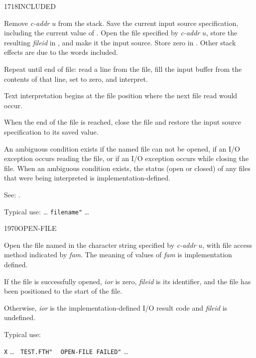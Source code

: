 \begin{newword}{1718}{INCLUDED}

	Remove \emph{c-addr} $u$ from the stack. Save the current input
	source specification, including the current value of
	. Open the file specified by \emph{c-addr} $u$,
	store the resulting \emph{fileid} in , and make
	it the input source. Store zero in . Other
	stack effects are due to the words included.

	Repeat until end of file: read a line from the file, fill the
	input buffer from the contents of that line, set 
	to zero, and interpret.

	Text interpretation begins at the file position where the next
	file read would occur.

	When the end of the file is reached, close the file and restore
	the input source specification to its saved value.

	An ambiguous condition exists if the named file can not be
	opened, if an I/O exception occurs reading the file, or if an
	I/O exception occurs while closing the file. When an ambiguous
	condition exists, the status (open or closed) of any files that
	were being interpreted is implementation-defined.

\item[See:]
	.

	\begin{rationale} %
		Typical use:
			{\ldots}  \texttt{filename"}  {\ldots}
	\end{rationale}
\end{newword}


\begin{newword}{1970}{OPEN-FILE}

	Open the file named in the character string specified by
	\emph{c-addr} $u$, with file access method indicated by
	\emph{fam}. The meaning of values of \emph{fam} is
	implementation 	defined.

	If the file is successfully opened, \emph{ior} is zero,
	\emph{fileid} is its identifier, and the file has been
	positioned to the start of the file.

	Otherwise, \emph{ior} is the implementation-defined I/O
	result code and \emph{fileid} is undefined.

	\begin{rationale} %
		Typical use:

		\tab \word[core]{:} \texttt{X} {\ldots}
				 \texttt{ TEST.FTH"} 
				~  \texttt{OPEN-FILE FAILED"}
		{\ldots} \word[core]{;}
	\end{rationale}
\end{newword}


